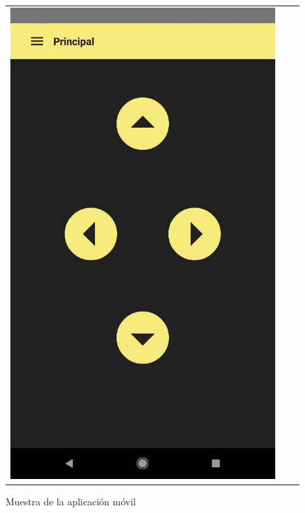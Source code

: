 \begin{figure}[h!]
\begin{tabular}{ccc}
  \includegraphics[scale=0.20]{img/App3.jpg}\\
\end{tabular}
\caption{Muestra de la aplicación móvil}
\end{figure}
